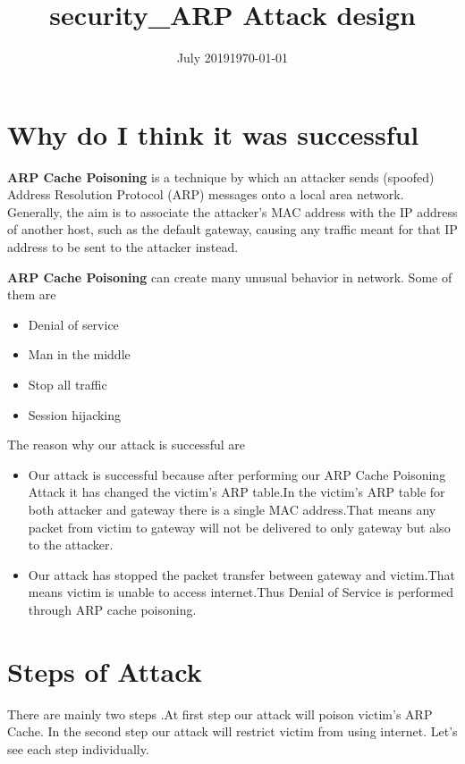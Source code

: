 \documentclass{article}
\title{security_ARP Attack design}
\date{July 2019}
\date{\today}
\begin{document}
\tableofcontents
\newpage


\section{Why do I think it was successful}
\textbf{ARP Cache Poisoning} is a technique by which an attacker sends (spoofed) Address Resolution Protocol (ARP) messages onto a local area network. Generally, the aim is to associate the attacker's MAC address with the IP address of another host, such as the default gateway, causing any traffic meant for that IP address to be sent to the attacker instead.

\textbf{ARP Cache Poisoning} can create many unusual behavior in  network. Some of them are 
\renewcommand\labelitemi{$\square$}
\begin{itemize}
    \item  Denial of service
    \item  Man in the middle 
    \item Stop all traffic
    \item  Session hijacking
    
\end{itemize}
The reason why our attack is successful are 


\begin{itemize}
    \item  Our attack is successful because after performing our ARP Cache Poisoning Attack it has changed the victim's ARP table.In the victim's ARP table for both attacker and gateway there is a single MAC address.That means any packet from victim to gateway will not be delivered to only gateway but also to the attacker.

    \item  Our attack has stopped the packet transfer between gateway and victim.That means victim is unable to access internet.Thus Denial of Service is performed through ARP cache poisoning.

\end{itemize}

\section{Steps of Attack}
There are mainly two steps .At first step our attack will poison victim's ARP Cache. In the second step our attack will restrict victim from using internet. Let's see each step individually.
\end{document}
